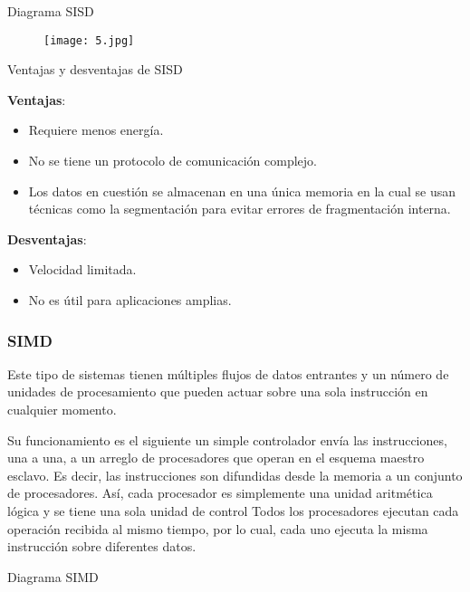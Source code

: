 \begin{center}
Diagrama SISD
\end{center}

\begin{figure}[h!]
		\centering
		{\texttt{[image: 5.jpg]}\par} \vspace{1cm}
\end{figure}

\begin{center}
Ventajas y desventajas de SISD
\end{center}

{\raggedright
\textbf{Ventajas}:
}

\begin{itemize}
	\item Requiere menos energía.
	\item No se tiene un protocolo de comunicación complejo.
	\item Los datos en cuestión se almacenan en una única memoria en la cual se usan técnicas como la segmentación para evitar errores de fragmentación interna.
\end{itemize}

{\raggedright
\textbf{Desventajas}:
}

\begin{itemize}
	\item Velocidad limitada.
	\item No es útil para aplicaciones amplias.
\end{itemize}

{\raggedright
\subsubsection{\textbf{SIMD}}
}

Este tipo de sistemas tienen múltiples flujos de datos entrantes y un número de unidades de procesamiento que pueden actuar sobre una sola instrucción en cualquier momento.

Su funcionamiento es el siguiente un simple controlador envía las instrucciones, una a una, a un arreglo de procesadores que operan en el esquema maestro esclavo. Es decir, las instrucciones son difundidas desde la memoria a un conjunto de procesadores. Así, cada procesador es simplemente una unidad aritmética lógica y se tiene una sola unidad de control Todos los procesadores ejecutan cada operación recibida al mismo tiempo, por lo cual, cada uno ejecuta la misma instrucción sobre diferentes datos.
\vspace{1cm}
\begin{center}
Diagrama SIMD
\end{center}

